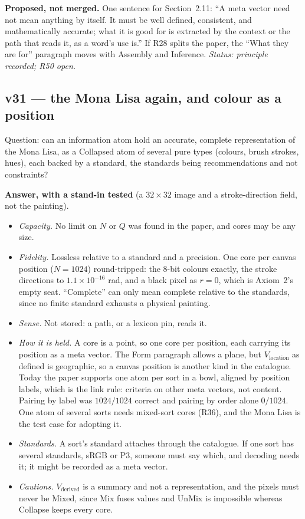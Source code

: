 \documentclass[11pt]{article}
\begin{document}
\textbf{Proposed, not merged.} One sentence for Section~2.11: ``A meta
vector need not mean anything by itself. It must be well defined,
consistent, and mathematically accurate; what it is good for is extracted
by the context or the path that reads it, as a word's use is.'' If R28
splits the paper, the ``What they are for'' paragraph moves with Assembly
and Inference.
\emph{Status: principle recorded; R50 open.}


\subsection*{v31 --- the Mona Lisa again, and colour as a position}
Question: can an information atom hold an accurate, complete
representation of the Mona Lisa, as a Collapsed atom of several pure types
(colours, brush strokes, hues), each backed by a standard, the standards
being recommendations and not constraints?

\textbf{Answer, with a stand-in tested} (a $32\times32$ image and a
stroke-direction field, not the painting).
\begin{itemize}
\item \emph{Capacity.} No limit on $N$ or $Q$ was found in the paper, and
cores may be any size.
\item \emph{Fidelity.} Lossless relative to a standard and a precision.
One core per canvas position ($N=1024$) round-tripped: the 8-bit colours
exactly, the stroke directions to $1.1\times10^{-16}$ rad, and a black
pixel as $r=0$, which is Axiom~2's empty seat. ``Complete'' can only mean
complete relative to the standards, since no finite standard exhausts a
physical painting.
\item \emph{Sense.} Not stored: a path, or a lexicon pin, reads it.
\item \emph{How it is held.} A core is a point, so one core per position,
each carrying its position as a meta vector. The Form paragraph allows a
plane, but $V_{\text{location}}$ as defined is geographic, so a canvas
position is another kind in the catalogue. Today the paper supports one
atom per sort in a bowl, aligned by position labels, which is the link
rule: criteria on other meta vectors, not content. Pairing by label was
$1024/1024$ correct and pairing by order alone $0/1024$. One atom of
several sorts needs mixed-sort cores (R36), and the Mona Lisa is the test
case for adopting it.
\item \emph{Standards.} A sort's standard attaches through the catalogue.
If one sort has several standards, sRGB or P3, someone must say which, and
decoding needs it; it might be recorded as a meta vector.
\item \emph{Cautions.} $V_{\text{derived}}$ is a summary and not a
representation, and the pixels must never be Mixed, since Mix fuses values
and UnMix is impossible whereas Collapse keeps every core.
\end{itemize}
\end{document}
